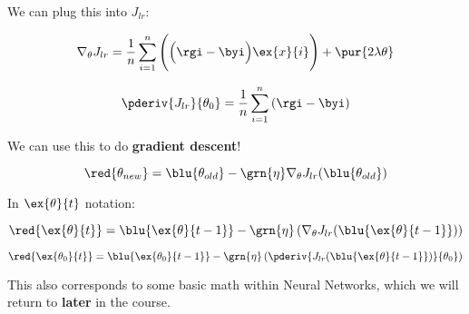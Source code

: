         We can plug this into $J_{lr}$:
        
        \begin{equation}
            \nabla_\theta J_{lr} 
            =
            \frac{1}{n} \sum_{i=1}^{n }
            \Bigg(
                \Big(\rgi - \byi \Big) \ex{x}{i}
            \Bigg)
            +
            \pur{ 2 \lambda \theta }
        \end{equation}
        
        \begin{equation}
            \pderiv{J_{lr}}{\theta_0}
            =
            \frac{1}{n} \sum_{i=1}^{n } \left( \rgi - \byi \right)
        \end{equation}
        
        We can use this to do \textbf{gradient descent}!
        
        \begin{equation}
            \red{ \theta_{new} } = \blu{ \theta_{old} } - \grn{\eta} \nabla_\theta J_{lr} (\blu{ \theta_{old} })
        \end{equation}
        
        In $\ex{\theta}{t}$ notation:
        
        \begin{equation}
            \red{ \ex{\theta}{t} } = \blu{ \ex{\theta}{t-1} } - \grn{\eta} 
            \left(
            \nabla_\theta J_{lr} (\blu{ \ex{\theta}{t-1} })
            \right)
        \end{equation}
        
        \begin{equation}
            \red{ \ex{\theta_0}{t} } = \blu{ \ex{\theta_0}{t-1} } - \grn{\eta} 
            \left(
                \pderiv{ J_{lr} (\blu{ \ex{\theta}{t-1} })}{\theta_0}
            \right)
        \end{equation}
        
        This also corresponds to some basic math within Neural Networks, which we will return to \textbf{later} in the course.
